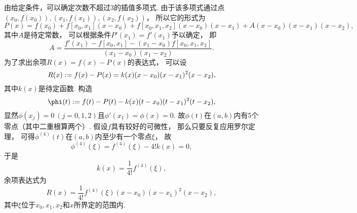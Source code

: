 由给定条件，可以确定次数不超过3的插值多项式.
由于该多项式通过点\(
	(x_0,f(x_0)),
	(x_1,f(x_1)),
	(x_2,f(x_2))
\)，
所以它的形式为\begin{equation*}
	P(x)
	= f(x_0)
	+ f[x_0,x_1] (x-x_0)
	+ f[x_0,x_1,x_2] (x-x_0)(x-x_1)
	+ A (x-x_0)(x-x_1)(x-x_2),
\end{equation*}
其中\(A\)是待定常数，
可以根据条件\(P'(x_1) = f'(x_1)\)予以确定，
即\begin{equation*}
	A = \frac{
		f'(x_1) - f[x_0,x_1] - (x_1-x_0) f[x_0,x_1,x_2]
	}{
		(x_1-x_0)(x_1-x_2)
	}.
\end{equation*}
为了求出余项\(R(x) = f(x) - P(x)\)的表达式，
可以设\begin{equation*}
	R(x)
	:= f(x) - P(x)
	= k(x) (x-x_0) (x-x_1)^2 (x-x_2),
\end{equation*}
其中\(k(x)\)是待定函数.
构造\begin{equation*}
	\phi(t)
	\defeq
	f(t) - P(t) - k(x) (t-x_0) (t-x_1)^2 (t-x_2),
\end{equation*}
显然\(\phi(x_j) = 0\ (j=0,1,2)\)且\(\phi'(x_1) = \phi(x) = 0\).
故\(\phi(t)\)在\((a,b)\)内有5个零点（其中二重根算两个）.
假设\(f\)具有较好的可微性，
那么只要反复应用罗尔定理，
可得\(\phi^{(4)}(t)\)在\((a,b)\)内至少有一个零点\(\xi\)，
故\begin{equation*}
	\phi^{(4)}(\xi) = f^{(4)}(\xi) - 4! k(x) = 0,
\end{equation*}
于是\begin{equation*}
	k(x) = \frac1{4!} f^{(4)}(\xi),
\end{equation*}
余项表达式为\begin{equation*}
	R(x) = \frac1{4!} f^{(4)}(\xi) (x-x_0) (x-x_1)^2 (x-x_2),
\end{equation*}
其中\(\xi\)位于\(x_0,x_1,x_2\)和\(x\)所界定的范围内.
